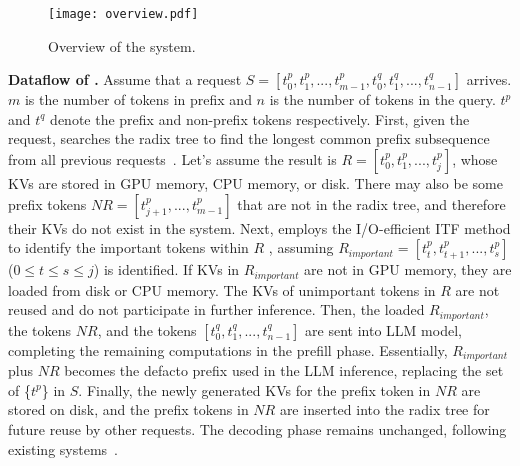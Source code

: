 
\begin{figure}
	\centering
	\texttt{[image: overview.pdf]}
	\caption{Overview of the \pname{} system.}
	\label{fig:overview}
	\vspace{-0.2in}
\end{figure}


\noindent \textbf{Dataflow of \pname{}.} 
Assume that a request $S=[t^p_0, t^p_1,...,t^p_{m-1}, t^q_0, t^q_1,...,t^q_{n-1}]$ arrives.
$m$ is the number of tokens in prefix and $n$ is the number of tokens in the query.
$t^p$ and $t^q$ denote the prefix and non-prefix tokens respectively. 
First, given the request, \pname{} searches the radix tree to find the longest common 
prefix subsequence from all previous requests~\cite{sglang-arxiv23, chunkattention-arxiv24}. 
Let's assume the result is  
$R=[t^p_0, t^p_1, ..., t^p_j]$, whose KVs are
stored in GPU memory, CPU memory, or disk.
There may also be some prefix tokens \( NR = [t^p_{j+1}, ..., t^p_{m-1}] \) that are not in the radix tree, and therefore their KVs do not exist in the system.
Next, \pname{} employs the I/O-efficient ITF method to identify 
the important tokens within $R$ , assuming $R_{important}=[t^p_{t}, t^p_{t+1}, ..., t^p_s]$ 
($ 0 \leq t \leq s \leq j$) is identified.
If KVs in $R_{important}$ are not in GPU memory, they are loaded from disk or CPU memory. 
The KVs of unimportant tokens in $R$ are not reused and do not participate in further inference.
Then, the loaded $R_{important}$, the tokens $NR$, and the tokens $[t^q_0, t^q_1,...,t^q_{n-1}]$   
are sent into LLM model, completing the remaining computations in the prefill phase.
Essentially, $R_{important}$ plus $NR$ becomes the defacto prefix used in the LLM inference,
replacing the set of \{$t^p$\} in $S$.
Finally, the newly generated KVs for the prefix token in $NR$ are stored on disk, 
and the prefix tokens in $NR$ are inserted into the radix tree for future reuse by other requests. 
The decoding phase remains unchanged, following existing systems~\cite{alluneed-nips17}.

